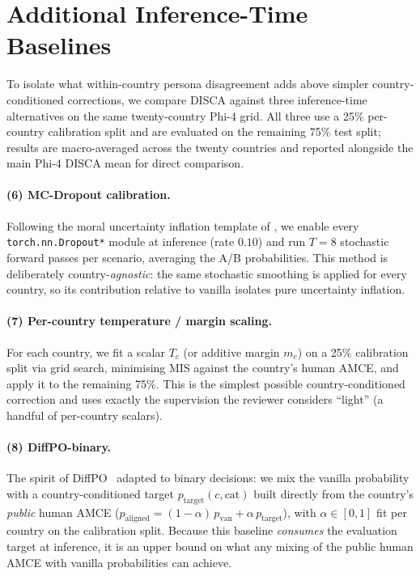 \documentclass{article}
\begin{document}
\section{Additional Inference-Time Baselines}
\label{app:r2_baselines}

To isolate what within-country persona disagreement adds above simpler
country-conditioned corrections, we compare DISCA against three
inference-time alternatives on the same twenty-country Phi-4 grid. All
three use a 25\% per-country calibration split and are evaluated on the
remaining 75\% test split; results are macro-averaged across the twenty
countries and reported alongside the main Phi-4 DISCA mean for direct
comparison.

\paragraph{(6) MC-Dropout calibration.} Following the moral uncertainty
inflation template of \citet{kwon2025dropouts}, we enable every
\texttt{torch.nn.Dropout*} module at inference (rate $0.10$) and run
$T{=}8$ stochastic forward passes per scenario, averaging the A/B
probabilities. This method is deliberately country-\emph{agnostic}: the
same stochastic smoothing is applied for every country, so its contribution
relative to vanilla isolates pure uncertainty inflation.

\paragraph{(7) Per-country temperature / margin scaling.} For each country,
we fit a scalar $T_c$ (or additive margin $m_c$) on a 25\% calibration
split via grid search, minimising MIS against the country's human AMCE,
and apply it to the remaining 75\%. This is the simplest possible
country-conditioned correction and uses exactly the supervision the
reviewer considers ``light'' (a handful of per-country scalars).

\paragraph{(8) DiffPO-binary.} The spirit of
DiffPO~\citep{chen2025diffpo} adapted to binary decisions: we mix the
vanilla probability with a country-conditioned target
$p_{\text{target}}(c, \mathrm{cat})$ built directly from the country's
\emph{public} human AMCE ($p_{\text{aligned}} = (1-\alpha)\,p_{\text{van}} +
\alpha\,p_{\text{target}}$), with $\alpha \in [0,1]$ fit per country on the
calibration split. Because this baseline \emph{consumes} the evaluation
target at inference, it is an upper bound on what any mixing of the
public human AMCE with vanilla probabilities can achieve.
\end{document}
